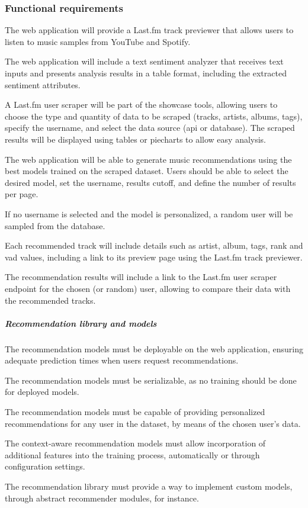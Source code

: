 \subsubsection{Functional requirements}
\begin{functionalmod}[WA]
    \item The web application will provide a Last.fm track previewer that allows users to listen to music samples from YouTube and Spotify.
    \item The web application will include a text sentiment analyzer that receives text inputs and presents analysis results in a table format, including the extracted sentiment attributes.
    \item A Last.fm user scraper will be part of the showcase tools, allowing users to choose the type and quantity of data to be scraped (tracks, artists, albums, tags), specify the username, and select the data source (\acs{api} or database). The scraped results will be displayed using tables or piecharts to allow easy analysis.
    \item The web application will be able to generate music recommendations using the best models trained on the scraped dataset. Users should be able to select the desired model, set the username, results cutoff, and define the number of results per page.
    \begin{functionalmod}[WA]
        \item If no username is selected and the model is personalized, a random user will be sampled from the database.
        \item Each recommended track will include details such as artist, album, tags, rank and \acs{vad} values, including a link to its preview page using the Last.fm track previewer.
        \item The recommendation results will include a link to the Last.fm user scraper endpoint for the chosen (or random) user, allowing to compare their data with the recommended tracks.
    \end{functionalmod}
    \setcounter{WAF}{\value{enumi}}
\end{functionalmod}
\subparagraph{Recommendation library and models}
\begin{functionalmod}[WA]
    \setcounter{enumi}{\value{WAF}}
    \item The recommendation models must be deployable on the web application, ensuring adequate prediction times when users request recommendations.
    \item The recommendation models must be serializable, as no training should be done for deployed models.
    \item The recommendation models must be capable of providing personalized recommendations for any user in the dataset, by means of the chosen user's data.
    \item The context-aware recommendation models must allow incorporation of additional features into the training process, automatically or through configuration settings.
    \item The recommendation library must provide a way to implement custom models, through abstract recommender modules, for instance.
\end{functionalmod}

